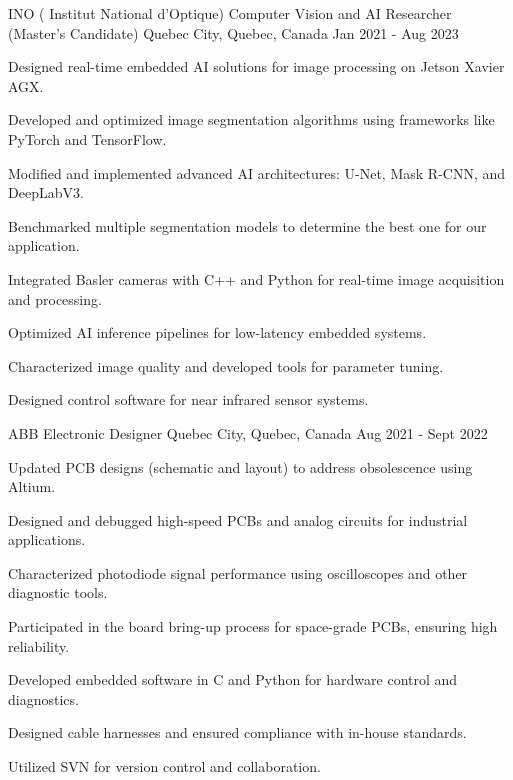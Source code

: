 \begin{cventries}
\cventry
    {INO ( Institut National d'Optique)} 
    {Computer Vision and AI Researcher (Master's Candidate)} 
    {Quebec City, Quebec, Canada} %
    {Jan 2021 - Aug 2023} %
    {
      \begin{cvitems} %
        \item Designed real-time embedded AI solutions for image processing on Jetson Xavier AGX.
        \item Developed and optimized image segmentation algorithms using frameworks like PyTorch and TensorFlow.
        \item Modified and implemented advanced AI architectures: U-Net, Mask R-CNN, and DeepLabV3.
        \item Benchmarked multiple segmentation models to determine the best one for our application.
        \item Integrated Basler cameras with C++ and Python for real-time image acquisition and processing.
        \item Optimized AI inference pipelines for low-latency embedded systems.
        \item Characterized image quality and developed tools for parameter tuning.
        \item Designed control software for near infrared sensor systems.
      \end{cvitems}
    }

\cventry
    {ABB} %
    {Electronic Designer} %
    {Quebec City, Quebec, Canada} %
    {Aug 2021 - Sept 2022} %
    {
      \begin{cvitems} %
        \item Updated PCB designs (schematic and layout) to address obsolescence using Altium.
        \item Designed and debugged high-speed PCBs and analog circuits for industrial applications.
        \item Characterized photodiode signal performance using oscilloscopes and other diagnostic tools.
        \item Participated in the board bring-up process for space-grade PCBs, ensuring high reliability.
        \item Developed embedded software in C and Python for hardware control and diagnostics.
        \item Designed cable harnesses and ensured compliance with in-house standards.
        \item Utilized SVN for version control and collaboration.
      \end{cvitems}
    }




\end{cventries}
